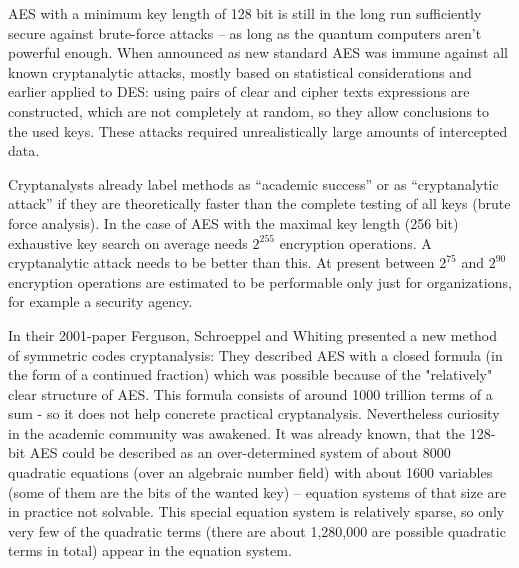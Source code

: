 AES with a minimum key length of 128 bit is still in the long run sufficiently secure against brute-force attacks -- as long as the quantum computers aren't powerful enough. When announced as new standard AES was immune against all known cryptanalytic attacks, mostly based on statistical considerations and earlier applied to DES: using pairs of clear and cipher texts expressions are constructed, which are not completely at random, so they allow conclusions to the used keys. These attacks required unrealistically large amounts of intercepted data.

Cryptanalysts already label methods as ``academic success'' or as ``cryptanalytic attack'' if they are theoretically faster than the complete testing of all keys (brute force analysis). In the case of AES with the maximal key length (256 bit) exhaustive key search on average needs $2^{255}$ encryption operations. A cryptanalytic attack needs to be better than this. At present between $2^{75}$ and $2^{90}$ encryption operations are estimated to be performable only just for organizations, for example a security agency.

In their 2001-paper Ferguson, Schroeppel and Whiting \cite{cm:Ferguson2001}
presented a new method of symmetric codes cryptanalysis: They described AES with
a closed formula (in the form of a continued fraction) which was possible
because of the "relatively" clear structure of AES. This formula consists of
around 1000 trillion terms of a sum - so it does not help concrete practical
cryptanalysis. Nevertheless curiosity in the academic community was awakened.
It was already known, that the 128-bit AES could be described as an
over-determined system of about 8000 quadratic equations (over an algebraic
number field) with about 1600 variables (some of them are the bits of the wanted
key) -- equation systems of that size are in practice not solvable. This special
equation system is relatively sparse, so only very few of the quadratic terms
(there are about 1,280,000 are possible quadratic terms in total) appear in the
equation system.

